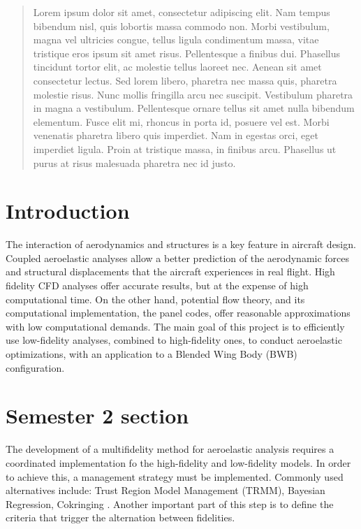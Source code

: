 \begin{abstract}
Lorem ipsum dolor sit amet, consectetur adipiscing elit. Nam tempus bibendum nisl, quis lobortis massa commodo non. Morbi vestibulum, magna vel ultricies congue, tellus ligula condimentum massa, vitae tristique eros ipsum sit amet risus. Pellentesque a finibus dui. Phasellus tincidunt tortor elit, ac molestie tellus laoreet nec. Aenean sit amet consectetur lectus. Sed lorem libero, pharetra nec massa quis, pharetra molestie risus. Nunc mollis fringilla arcu nec suscipit. Vestibulum pharetra in magna a vestibulum. Pellentesque ornare tellus sit amet nulla bibendum elementum. Fusce elit mi, rhoncus in porta id, posuere vel est. Morbi venenatis pharetra libero quis imperdiet. Nam in egestas orci, eget imperdiet ligula. Proin at tristique massa, in finibus arcu. Phasellus ut purus at risus malesuada pharetra nec id justo. 

\end{abstract}

\printnomenclature
\section{Introduction}
\label{sec:introduction}

The interaction of aerodynamics and structures is a key feature in aircraft design. Coupled aeroelastic analyses allow a better prediction of the aerodynamic forces and structural displacements that the aircraft experiences in real flight. High fidelity CFD analyses offer accurate results, but at the expense of high computational time. On the other hand, potential flow theory, and its computational implementation, the panel codes, offer reasonable approximations with low computational demands. The main goal of this project is to efficiently use low-fidelity analyses, combined to high-fidelity ones, to conduct aeroelastic optimizations, with an application to a Blended Wing Body (BWB) configuration.

\section{Semester 2 section}
\label{sec:projectissues}
The development of a multifidelity method for aeroelastic analysis requires a coordinated implementation fo the high-fidelity and low-fidelity models. In order to achieve this, a management strategy must be implemented. Commonly used alternatives include: Trust Region Model Management (TRMM), Bayesian Regression, Cokringing \cite{peherstorfer2018survey}. Another important part of this step is to define the criteria that trigger the alternation between fidelities.

